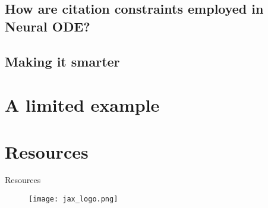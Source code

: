 \documentclass[dvipsnames, 9pt]{beamer}
\begin{document}
\subsection{How are citation constraints employed in Neural ODE?}
\subsection{Making it smarter}
\section{A limited example}
\section{Resources}

\begin{frame}{Resources}
\begin{figure}[H]
\centering
\texttt{[image: jax\_logo.png]}
\end{figure}
\end{frame}
\end{document}
